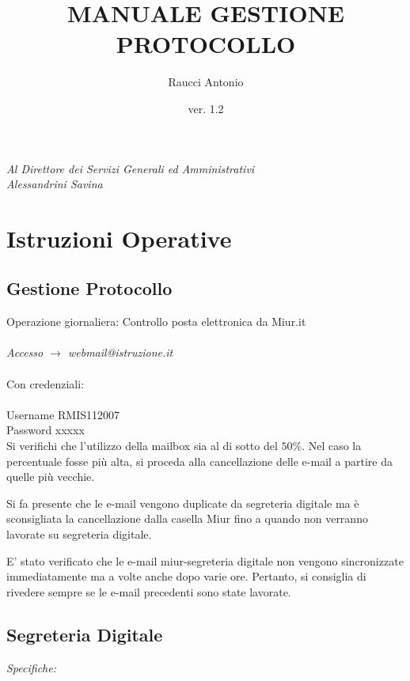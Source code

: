 \documentclass[a4paper,italian,12pt]{book}
\title{MANUALE GESTIONE PROTOCOLLO}
\author{Raucci Antonio}
\date{ver. 1.2}
\begin{document}
 
\maketitle
\tableofcontents

\newpage 
\null{}
\begin{flushright}
\textit{Al Direttore dei Servizi Generali ed Amministrativi \\ Alessandrini Savina}
\end{flushright}
\null

\chapter{Istruzioni Operative}
\section{Gestione Protocollo}
Operazione giornaliera:
Controllo posta elettronica da Miur.it \\
\\
\textit{Accesso $\to$ webmail@istruzione.it} \\
\\
Con credenziali: \\
\\
Username RMIS112007 \\
Password xxxxx \\

Si verifichi che l'utilizzo della mailbox sia al di sotto del $50\%$. Nel caso la percentuale fosse più alta, si proceda alla cancellazione delle e-mail a partire da quelle più vecchie.

Si fa presente che le e-mail vengono duplicate da segreteria digitale ma è sconsigliata la cancellazione dalla casella Miur fino a quando non verranno lavorate su segreteria digitale.

E' stato verificato che le e-mail miur-segreteria digitale non vengono sincronizzate immediatamente ma a volte anche dopo varie ore. Pertanto, si consiglia di rivedere sempre se le e-mail precedenti sono state lavorate.

\section{Segreteria Digitale}
\textit{Specifiche:} 
\end{document}
